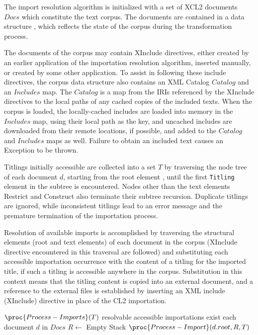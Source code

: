 \documentclass{IOS-Book-Article}
\begin{document}
The import resolution algorithm is initialized with a set of XCL2 documents $Docs$ which constitute the text corpus. The documents are contained in a data structure , which reflects the state of the corpus during the transformation process. 

The documents of the corpus may contain XInclude directives, either created by an earlier application of the importation resolution algorithm, inserted manually, or created by some other application. To assist in following these include directives, the corpus data structure also contains an XML Catalog $Catalog$ and an $Includes$ map. The $Catalog$ is a map from the IRIs referenced by the XInclude directives to the local paths of any cached copies of the included texts. When the corpus is loaded, the locally-cached includes are loaded into memory in the $Includes$ map, using their local path as the key, and uncached includes are downloaded from their remote locations, if possible, and added to the $Catalog$ and $Includes$ maps as well. Failure to obtain an included text causes an Exception to be thrown.

Titlings initially accessible are collected into a set $T$ by traversing the node tree of each document $d$, starting from the root element , until the first \texttt{Titling} element in the subtree is encountered. Nodes other than the text elements Restrict and Construct also terminate their subtree recursion. Duplicate titlings are ignored, while inconsistent titlings
lead to an error message and the premature termination of the importation process. 

Resolution of available imports is accomplished by traversing the structural elements (root and text elements) of each document in the corpus (XInclude directive encountered in this traversal are followed) and substituting each accessible importation occurrence with the content of a titling for the imported title, if such a titling is accessible anywhere in the corpus. Substitution in this context means that the titling content is copied into an external document, and a reference to the external files is established by inserting an XML include (XInclude) directive in place of the CL2 importation. 

\begin{codebox}
\li $\proc{Process-Imports}(T)$
\li \While resolvable accessible importations exist
\li     \Do \For each document $d$ in $Docs$
\li         \Do
\li         $R \gets$ Empty Stack
\li         $\proc{Process-Import}(d.root, R, T)$
\End %
\End %
\end{codebox}
\end{document}
